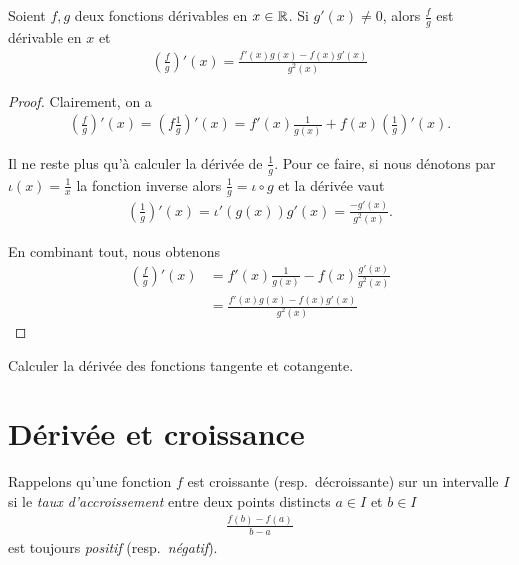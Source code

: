 \documentclass[main.tex]{subfiles}
\begin{document}
\begin{proposition}

    Soient $f, g$ deux fonctions dérivables en $x \in \mathbb{R}$.
    Si $g'(x) \neq 0$,
    alors $\frac f g$ est dérivable en $x$ et
    \begin{align}
        \left(\frac f g\right)'(x) = \frac {f'(x) g(x) - f(x) g'(x)} {g^2(x)}
    \end{align}
\end{proposition}
\begin{proof}
    Clairement,
    on a
    \begin{align}
        \left(\frac f g\right)'(x)
        = \left(f \frac 1 g\right)'(x)
        = f'(x) \frac 1 {g(x)} + f(x) \left(\frac 1 g\right)'(x).
    \end{align}

    Il ne reste plus qu'à calculer la dérivée de $\frac 1 g$.
    Pour ce faire,
    si nous dénotons par $\iota(x) = \frac 1 x$ la fonction inverse
    alors $\frac 1 g = \iota \circ g$ et la dérivée vaut
    \begin{align}
        \left(\frac 1 g\right)'(x) = \iota'(g(x)) g'(x) = \frac {-g'(x)} {g^2(x)}.
    \end{align}

    En combinant tout,
    nous obtenons
    \begin{align}
        \left(\frac f g\right)'(x)
        &= f'(x) \frac 1 {g(x)} - f(x) \frac {g'(x)} {g^2(x)}\\
        &= \frac {f'(x) g(x) - f(x) g'(x)} {g^2(x)}
    \end{align}
\end{proof}

\begin{exercise}
    Calculer la dérivée des fonctions tangente et cotangente.
\end{exercise}

\section{Dérivée et croissance}

Rappelons qu'une fonction $f$ est croissante (resp.\ décroissante) sur un intervalle $I$
si le \emph{taux d'accroissement} entre deux points distincts $a \in I$ et $b \in I$
\begin{align}
    \frac {f(b) - f(a)} {b - a}
\end{align}
est toujours \emph{positif} (resp.\ \emph{négatif}).
\end{document}
